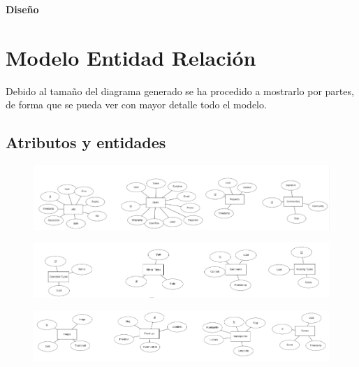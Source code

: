 \newpage{\pagestyle{empty}\cleardoublepage}
\newpage
\vspace*{\fill}
    \begin{center}
      \thispagestyle{empty} \vspace*{0cm} \textbf{\huge
Dise\~{n}o}
    \end{center}
    \vspace*{\fill}
\newpage{\pagestyle{empty}\cleardoublepage}
\chapter{Modelo Entidad Relaci\'{o}n}

Debido al tama\~{n}o del diagrama generado se ha procedido a mostrarlo por partes, de forma que se pueda ver con mayor detalle todo el modelo.

\section{Atributos y entidades}
\begin{figure}[h!]
\centering
\includegraphics[width=1\textwidth]{Img/Disenyo/ER/upohouse_er_attr_1.PNG}
\end{figure}
\begin{figure}[h!]
\centering
\includegraphics[width=1\textwidth]{Img/Disenyo/ER/upohouse_er_attr_2.PNG}
\end{figure}
\begin{figure}[h!]
\centering
\includegraphics[width=1\textwidth]{Img/Disenyo/ER/upohouse_er_attr_3.PNG}
\end{figure}

\pagebreak

